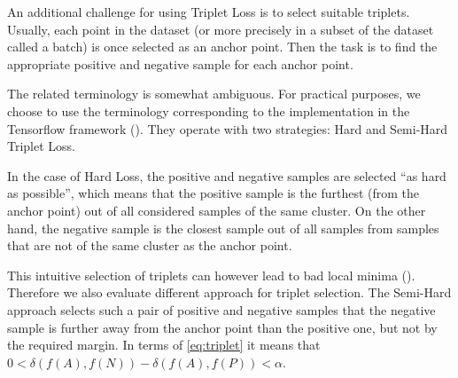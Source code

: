 An additional challenge for using Triplet Loss is to select suitable triplets. Usually, each point in the dataset (or more precisely in a subset of the dataset called a batch) is once selected as an anchor point. Then the task is to find the appropriate positive and negative sample for each anchor point.

The related terminology is somewhat ambiguous. For practical purposes, we choose to use the terminology corresponding to the implementation in the Tensorflow framework (\cite{tensorflow}). They operate with two strategies: Hard and Semi-Hard Triplet Loss.

In the case of Hard Loss, the positive and negative samples are selected ``as hard as possible'', which means that the positive sample is the furthest (from the anchor point) out of all considered samples of the same cluster. On the other hand, the negative sample is the closest sample out of all samples from samples that are not of the same cluster as the anchor point.

This intuitive selection of triplets can however lead to bad local minima (\cite{tripletlossnn}). Therefore we also evaluate different approach for triplet selection. The Semi-Hard approach selects such a pair of positive and negative samples that the negative sample is further away from the anchor point than the positive one, but not by the required margin. In terms of \autoref{eq:triplet} it means that $0 < \delta(f(A), f(N)) - \delta(f(A), f(P)) < \alpha$.